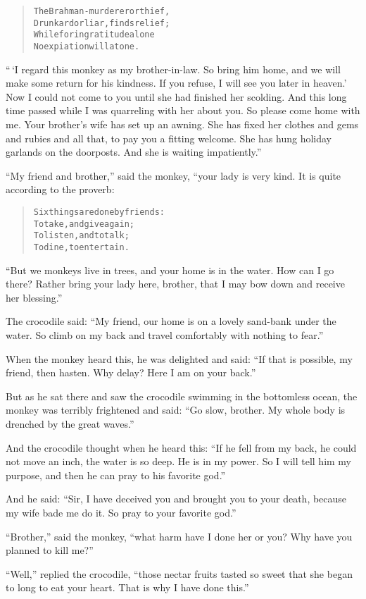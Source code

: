 \documentclass[article, twoside, 14pt]{memoir}
\renewenvironment{verbatim}{%
\begin{quote}%
\vskip -10pt%
\begin{alltt}\normalfont\large}{\end{alltt}%
\end{quote}%
\vskip -10pt
} %
\begin{document}
\begin{verbatim}
The Brahman-murderer or thief,
Drunkard or liar, finds relief;
While for ingratitude alone
No expiation will atone.
\end{verbatim}
``\,`I regard this monkey as my brother-in-law. So bring him home, and we will make some return for his kindness. If you refuse, I will see you later in heaven.' Now I could not come to you until she had finished her scolding. And this long time passed while I was quarreling with her about you. So please come home with me. Your brother's wife has set up an awning. She has fixed her clothes and gems and rubies and all that, to pay you a fitting welcome. She has hung holiday garlands on the doorposts. And she is waiting impatiently.''

``My friend and brother,'' said the monkey, “your lady is very
kind. It is quite according to the proverb:

\begin{verbatim}
Six things are done by friends:
To take, and give again;
To listen, and to talk;
To dine, to entertain.
\end{verbatim}
``But we monkeys live in trees, and your home is in the water. How can I go there? Rather bring your lady here, brother, that I may bow down and receive her blessing.''

The crocodile said:
``My friend, our home is on a lovely sand-bank under the water. So climb on my back and travel comfortably with nothing to fear.''

When the monkey heard this, he was delighted and said:
``If that is possible, my friend, then hasten. Why delay? Here I am on your back.''

But as he sat there and saw the crocodile swimming in the
bottomless ocean, the monkey was terribly frightened and said:
``Go slow, brother. My whole body is drenched by the great waves.''

And the crocodile thought when he heard this:
``If he fell from my back, he could not move an inch, the water is so deep. He is in my power. So I will tell him my purpose, and then he can pray to his favorite god.''

And he said:
``Sir, I have deceived you and brought you to your death, because my wife bade me do it. So pray to your favorite god.''

``Brother,'' said the monkey,
``what harm have I done her or you? Why have you planned to kill me?''

``Well,'' replied the crocodile,
``those nectar fruits tasted so sweet that she began to long to eat your heart. That is why I have done this.''
\end{document}
